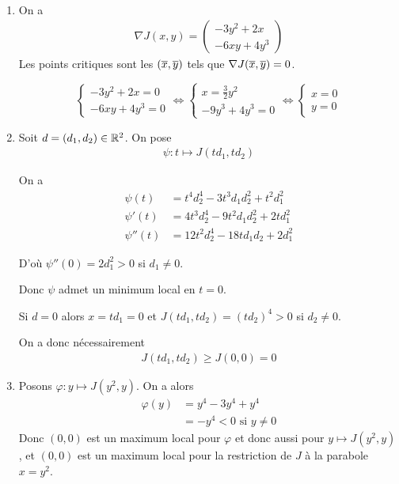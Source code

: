 \documentclass[french,a4paper,10pt]{article}
\begin{document}
	\begin{td-sol}\,
		\begin{enumerate}
			\item On a
				\[\begin{aligned}
					\nabla J(x,y)=\begin{pmatrix}
						-3y^2+2x\\
						-6xy+4y^3
					\end{pmatrix}
				\end{aligned}\]
				Les points critiques sont les $(\overline{x},\overline{y})$ tels que $\nabla J(\overline{x},\overline{y})=0$.
				
				\[
				\begin{cases}
					-3y^2+2x=0\\
					-6xy+4y^3=0
				\end{cases}\Longleftrightarrow
				\begin{cases}
					x=\frac32y^2\\
					-9y^3+4y^3=0
				\end{cases}\Longleftrightarrow
				\begin{cases}
					x=0\\
					y=0
				\end{cases}
				\]
				
			\item Soit $d=(d_1,d_2)\in\mathbb{R}^2$. On pose 
				\[\begin{aligned}
					\psi\colon t\mapsto J(td_1,td_2)
				\end{aligned}\]
				
				On a 
					\[\begin{aligned}
						\psi(t)&=t^4d_2^4-3t^3d_1d_2^2+t^2d_1^2\\
						\psi'(t)&=4t^3d_2^4-9t^2d_1d_2^2+2td_1^2\\
						\psi''(t)&=12t^2d_2^4-18td_1d_2+2d_1^2
					\end{aligned}\]
					
				D'où $\psi''(0)=2d_1^2>0$ si $d_1\ne0$.
				
				Donc $\psi$ admet un minimum local en $t=0$.
				
				Si $d=0$ alors $x=td_1=0$ et $J(td_1,td_2)=(td_2)^4>0$ si $d_2\ne 0$.
				
				On a donc nécessairement
					\[\begin{aligned}
						J(td_1,td_2)\ge J(0,0)=0
					\end{aligned}\]
					
			\item  Posons $\varphi\colon y\mapsto J(y^2,y)$. On a alors
				\[\begin{aligned}
					\varphi(y)&=y^4-3y^4+y^4\\
					&=-y^4<0\text{ si }y\ne 0
				\end{aligned}\]
				Donc $(0,0)$ est un maximum local pour $\varphi$ et donc aussi pour $y\mapsto J(y^2,y)$, et $(0,0)$ est un maximum local pour la restriction de $J$ à la parabole $x=y^2$.
				

\end{enumerate}
\end{td-sol}
\end{document}
